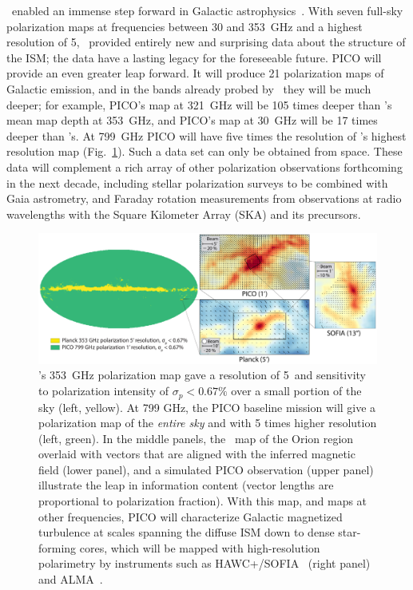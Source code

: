 \documentclass[PICOReport.tex]{subfiles}
\begin{document}
\planck\ enabled an immense step forward in Galactic astrophysics~\citep{Planck2018:XII}. With seven full-sky polarization maps at frequencies between 30 and 353~GHz and a highest resolution of 5\arcmin, \planck\ provided entirely new and surprising data about the structure of the \ac{ISM}; the data have a lasting legacy for the foreseeable future. PICO will provide an even greater leap forward. It will produce 21 polarization maps of Galactic emission, and in the bands already probed by \planck\ they will be much deeper; for example, PICO's map at 321~GHz will be 105 times deeper than \planck's mean map depth at 353~GHz, and PICO's map at 30~GHz will be 17 times deeper than \planck's.  At 799~GHz PICO will have five times the resolution of \planck 's highest resolution map (Fig.~\ref{fig:allsky}). Such a data set can only be obtained from space. These data will complement a rich array of other polarization observations forthcoming in the next decade, including stellar polarization surveys to be combined with Gaia astrometry, and Faraday rotation measurements from  observations at radio wavelengths with the  Square Kilometer Array (SKA) and its precursors.
\begin{figure}[ht]
    \centering
    \includegraphics[width=6.5in]{galsci_fig_v4.pdf}
\vspace{-0.25in}
    \caption{\captiontext  \planck 's 353~GHz polarization map gave a resolution of 5\arcmin~and sensitivity to polarization intensity of $\sigma_{p} < 0.67\%$ over a small portion of the sky (left, yellow).  At 799 GHz, the PICO baseline mission will give a polarization map of the {\it entire sky} and with 5 times higher resolution (left, green). In the middle panels, the \planck~map of the Orion region overlaid with vectors that are aligned with the inferred magnetic field (lower panel), and a simulated PICO observation (upper panel) illustrate the leap in information content (vector lengths are proportional to polarization fraction). With this map, and maps at other frequencies, PICO will characterize Galactic magnetized turbulence at scales spanning the diffuse ISM down to dense star-forming cores, which will be mapped with high-resolution polarimetry by instruments such as HAWC+/SOFIA~\citep{Chuss2018} (right panel) and ALMA~\citep{Bacciotti2018ApJ}.
    \label{fig:allsky} }
\vspace{-0.10in}
\end{figure}
\end{document}
